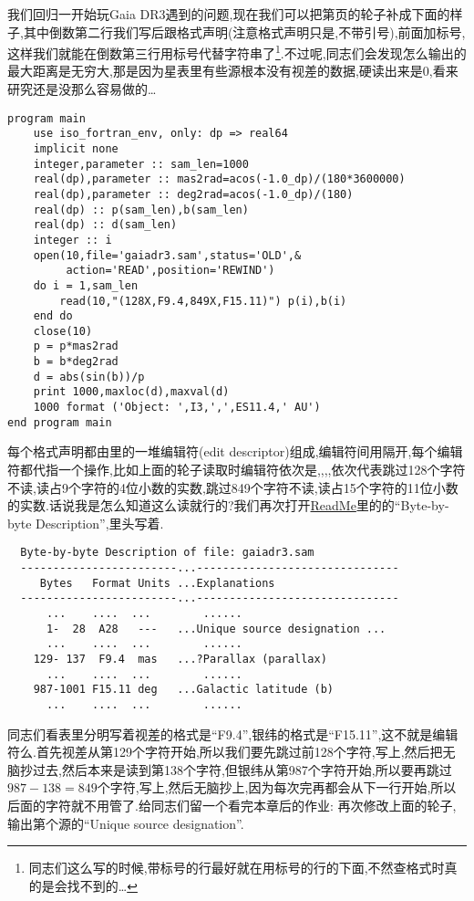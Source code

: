 我们回归一开始玩Gaia DR3遇到的问题,现在我们可以把第\pageref{gaiadr3.sam}页的轮子补成下面的样子,其中倒数第二行我们写后跟格式声明(注意格式声明只是,不带引号),前面加标号,这样我们就能在倒数第三行用标号代替字符串了\footnote{同志们这么写的时候,带标号的行最好就在用标号的行的下面,不然查格式时真的是会找不到的\dots}.不过呢,同志们会发现怎么输出的最大距离是无穷大,那是因为星表里有些源根本没有视差的数据,硬读出来是$0$,看来研究还是没那么容易做的\dots
\begin{lstlisting}
program main
    use iso_fortran_env, only: dp => real64
    implicit none
    integer,parameter :: sam_len=1000
    real(dp),parameter :: mas2rad=acos(-1.0_dp)/(180*3600000)
    real(dp),parameter :: deg2rad=acos(-1.0_dp)/(180)
    real(dp) :: p(sam_len),b(sam_len)
    real(dp) :: d(sam_len)
    integer :: i
    open(10,file='gaiadr3.sam',status='OLD',&
         action='READ',position='REWIND')
    do i = 1,sam_len
        read(10,"(128X,F9.4,849X,F15.11)") p(i),b(i)
    end do
    close(10)
    p = p*mas2rad
    b = b*deg2rad
    d = abs(sin(b))/p
    print 1000,maxloc(d),maxval(d)
    1000 format ('Object: ',I3,',',ES11.4,' AU')
end program main
\end{lstlisting}

每个格式声明都由\ttt{()}里的一堆编辑符(edit descriptor)组成,编辑符间用\ttt{,}隔开,每个编辑符都代指一个操作,比如上面的轮子读取时编辑符依次是,,,,依次代表跳过128个字符不读,读占9个字符的4位小数的实数,跳过849个字符不读,读占15个字符的11位小数的实数.话说我是怎么知道这么读就行的?我们再次打开\href{https://cdsarc.cds.unistra.fr/viz-bin/ReadMe/I/355?format=html&tex=true}{ReadMe}里的的``Byte-by-byte Description'',里头写着.
\begin{lstlisting}
  Byte-by-byte Description of file: gaiadr3.sam
  ------------------------...-------------------------------
     Bytes   Format Units ...Explanations
  ------------------------...-------------------------------
      ...    ....  ...        ......
      1-  28  A28   ---   ...Unique source designation ...
      ...    ....  ...        ......
    129- 137  F9.4  mas   ...?Parallax (parallax)
      ...    ....  ...        ......
    987-1001 F15.11 deg   ...Galactic latitude (b)
      ...    ....  ...        ......
\end{lstlisting}
同志们看表里分明写着视差的格式是``F9.4'',银纬的格式是``F15.11'',这不就是编辑符么.首先视差从第129个字符开始,所以我们要先跳过前128个字符,写上,然后把无脑抄过去,然后本来是读到第138个字符,但银纬从第987个字符开始,所以要再跳过$987-138=849$个字符,写上,然后无脑抄上,因为每次完再都会从下一行开始,所以后面的字符就不用管了.给同志们留一个看完本章后的作业: 再次修改上面的轮子,输出第个源的``Unique source designation''.

